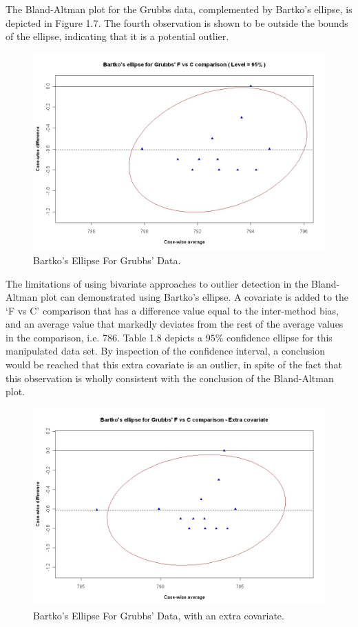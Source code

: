 \documentclass[Chap2main.tex]{subfiles}
\begin{document}

The Bland-Altman plot for the Grubbs data, complemented by Bartko's ellipse, is depicted in Figure 1.7.
The fourth observation is shown to be outside the bounds of the ellipse, indicating that it is a potential outlier.


\begin{figure}[h!]
	\includegraphics[width=130mm]{GrubbsBartko.jpeg}
	\caption{Bartko's Ellipse For Grubbs' Data.}\label{GrubbsBartko}
\end{figure}

The limitations of using bivariate approaches to outlier detection
in the Bland-Altman plot can demonstrated using Bartko's ellipse.
A covariate is added to the `F vs C' comparison that has a
difference value equal to the inter-method bias, and an average
value that markedly deviates from the rest of the average values
in the comparison, i.e. 786. Table 1.8 depicts a $95\%$ confidence
ellipse for this manipulated data set. By inspection of the
confidence interval, a conclusion would be reached that this extra
covariate is an outlier, in spite of the fact that this
observation is wholly consistent with the conclusion of the
Bland-Altman plot.

\begin{figure}[h!]
	\includegraphics[width=130mm]{GrubbsBartko2.jpeg}
	\caption{Bartko's Ellipse For Grubbs' Data, with an extra covariate.}\label{GrubbsBartko2}
\end{figure}
\end{document}
